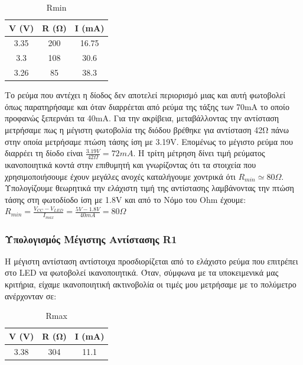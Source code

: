 \documentclass[a4paper,10pt]{article} \usepackage{anysize}
\begin{document}
\begin{table}[H] 
\caption{Rmin} 
\begin{center} 
\begin{tabular}{|c|c|c|}
\hline
\textbf{V (V)}&\textbf{R (Ω)}&\textbf{I (mA)}\\ 
\hline 3.35&200&16.75\\ 
\hline 3.3&108&30.6\\ 
\hline 3.26&85&38.3\\ 
\hline \end{tabular} 
\end{center}
\end{table} 
Το ρεύμα που αντέχει η δίοδος δεν αποτελεί περιορισμό μιας και
αυτή φωτοβολεί όπως παρατηρήσαμε και όταν διαρρέεται από ρεύμα της τάξης των
70mA το οποίο προφανώς ξεπερνάει τα 40mA. Για την ακρίβεια, μεταβάλλοντας την
αντίσταση μετρήσαμε πως η μέγιστη φωτοβολία της διόδου βρέθηκε για αντίσταση
42Ω πάνω στην οποία μετρήσαμε πτώση τάσης ίση με 3.19V. Επομένως το μέγιστο
ρεύμα που διαρρέει τη δίοδο είναι 
\begin{math}
\frac{3.19V}{42\Omega}={72mA}
\end{math}.  
Η τρίτη μέτρηση δίνει τιμή ρεύματος
ικανοποιητικά κοντά στην επιθυμητή και γνωρίζοντας ότι τα στοιχεία που
χρησιμοποιήσουμε έχουν μεγάλες ανοχές καταλήγουμε χοντρικά ότι 
\begin{math}
R_{min}\simeq80\Omega
\end{math}.  
Υπολογίζουμε θεωρητικά την ελάχιστη τιμή της
αντίστασης λαμβάνοντας την πτώση τάσης στη φωτοδίοδο ίση με 1.8V και από το
Νόμο του Ohm έχουμε: 
\begin{math} R_{min}=\frac{V_{CC} - V_{LED}}{I_{max}} = \frac{5V-1.8V}{40mA} =80\Omega\end{math}
\pagebreak
\subsubsection*{\textnormal{Υπολογισμός Μέγιστης Αντίστασης R1}} Η μέγιστη
αντίσταση αντίστοιχα προσδιορίζεται από το ελάχιστο ρεύμα που επιτρέπει στο
LED να φωτοβολεί ικανοποιητικά.  Όταν, σύμφωνα με τα υποκειμενικά μας κριτήρια,
είχαμε ικανοποιητική ακτινοβολία οι τιμές μου μετρήσαμε με το πολύμετρο
ανέρχονταν σε:


\begin{table}[H] \caption{Rmax} 
\begin{center} 
\begin{tabular}{|c|c|c|} 
\hline
\textbf{V (V)}&\textbf{R (Ω)}&\textbf{I (mA)}\\ 
\hline 3.38&304&11.1\\ 
\hline
\end{tabular} 
\end{center} 
\end{table}
\end{document}
